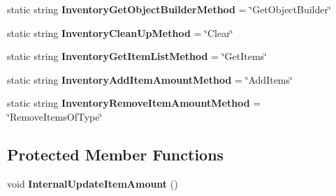 \begin{DoxyCompactItemize}
\item 
\hypertarget{class_s_e_mod_a_p_i_internal_1_1_a_p_i_1_1_entity_1_1_inventory_entity_aeb7255382faa985e149a191b3478d720}{}static string {\bfseries Inventory\+Get\+Object\+Builder\+Method} = \char`\"{}Get\+Object\+Builder\char`\"{}\label{class_s_e_mod_a_p_i_internal_1_1_a_p_i_1_1_entity_1_1_inventory_entity_aeb7255382faa985e149a191b3478d720}

\item 
\hypertarget{class_s_e_mod_a_p_i_internal_1_1_a_p_i_1_1_entity_1_1_inventory_entity_a8014542ef1e102e42b31b01ccfa3d13c}{}static string {\bfseries Inventory\+Clean\+Up\+Method} = \char`\"{}Clear\char`\"{}\label{class_s_e_mod_a_p_i_internal_1_1_a_p_i_1_1_entity_1_1_inventory_entity_a8014542ef1e102e42b31b01ccfa3d13c}

\item 
\hypertarget{class_s_e_mod_a_p_i_internal_1_1_a_p_i_1_1_entity_1_1_inventory_entity_a58c43244336a6af278efdbb5b44afab8}{}static string {\bfseries Inventory\+Get\+Item\+List\+Method} = \char`\"{}Get\+Items\char`\"{}\label{class_s_e_mod_a_p_i_internal_1_1_a_p_i_1_1_entity_1_1_inventory_entity_a58c43244336a6af278efdbb5b44afab8}

\item 
\hypertarget{class_s_e_mod_a_p_i_internal_1_1_a_p_i_1_1_entity_1_1_inventory_entity_a496e978bf97a8a379a65abe7f77c25a5}{}static string {\bfseries Inventory\+Add\+Item\+Amount\+Method} = \char`\"{}Add\+Items\char`\"{}\label{class_s_e_mod_a_p_i_internal_1_1_a_p_i_1_1_entity_1_1_inventory_entity_a496e978bf97a8a379a65abe7f77c25a5}

\item 
\hypertarget{class_s_e_mod_a_p_i_internal_1_1_a_p_i_1_1_entity_1_1_inventory_entity_a11c7203925a441daedce04dae2c80e95}{}static string {\bfseries Inventory\+Remove\+Item\+Amount\+Method} = \char`\"{}Remove\+Items\+Of\+Type\char`\"{}\label{class_s_e_mod_a_p_i_internal_1_1_a_p_i_1_1_entity_1_1_inventory_entity_a11c7203925a441daedce04dae2c80e95}

\end{DoxyCompactItemize}
\subsection*{Protected Member Functions}
\begin{DoxyCompactItemize}
\item 
\hypertarget{class_s_e_mod_a_p_i_internal_1_1_a_p_i_1_1_entity_1_1_inventory_entity_ae2e1b9571d845815561bf87a1e673a66}{}void {\bfseries Internal\+Update\+Item\+Amount} ()\label{class_s_e_mod_a_p_i_internal_1_1_a_p_i_1_1_entity_1_1_inventory_entity_ae2e1b9571d845815561bf87a1e673a66}

\end{DoxyCompactItemize}
